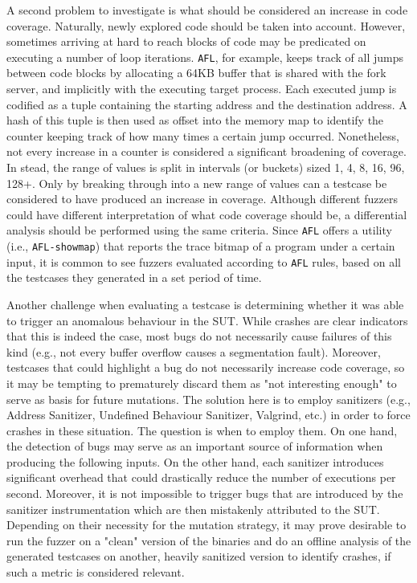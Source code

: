 A second problem to investigate is what should be considered an increase in code coverage. Naturally, newly explored code should be taken into account. However, sometimes arriving at hard to reach blocks of code may be predicated on executing a number of loop iterations. \texttt{AFL}, for example, keeps track of all jumps between code blocks by allocating a 64KB buffer that is shared with the fork server, and implicitly with the executing target process. Each executed jump is codified as a tuple containing the starting address and the destination address. A hash of this tuple is then used as offset into the memory map to identify the counter keeping track of how many times a certain jump occurred. Nonetheless, not every increase in a counter is considered a significant broadening of coverage. In stead, the range of values is split in intervals (or buckets) sized 1, 4, 8, 16, 96, 128+. Only by breaking through into a new range of values can a testcase be considered to have produced an increase in coverage. Although different fuzzers could have different interpretation of what code coverage should be, a differential analysis should be performed using the same criteria. Since \texttt{AFL} offers a utility (i.e., \texttt{\texttt{AFL}-showmap}) that reports the trace bitmap of a program under a certain input, it is common to see fuzzers evaluated according to \texttt{AFL} rules, based on all the testcases they generated in a set period of time.

Another challenge when evaluating a testcase is determining whether it was able to trigger an anomalous behaviour in the SUT. While crashes are clear indicators that this is indeed the case, most bugs do not necessarily cause failures of this kind (e.g., not every buffer overflow causes a segmentation fault). Moreover, testcases that could highlight a bug do not necessarily increase code coverage, so it may be tempting to prematurely discard them as "not interesting enough" to serve as basis for future mutations. The solution here is to employ sanitizers (e.g., Address Sanitizer, Undefined Behaviour Sanitizer, Valgrind, etc.) in order to force crashes in these situation. The question is when to employ them. On one hand, the detection of bugs may serve as an important source of information when producing the following inputs. On the other hand, each sanitizer introduces significant overhead that could drastically reduce the number of executions per second. Moreover, it is not impossible to trigger bugs that are introduced by the sanitizer instrumentation which are then mistakenly attributed to the SUT. Depending on their necessity for the mutation strategy, it may prove desirable to run the fuzzer on a "clean" version of the binaries and do an offline analysis of the generated testcases on another, heavily sanitized version to identify crashes, if such a metric is considered relevant.

